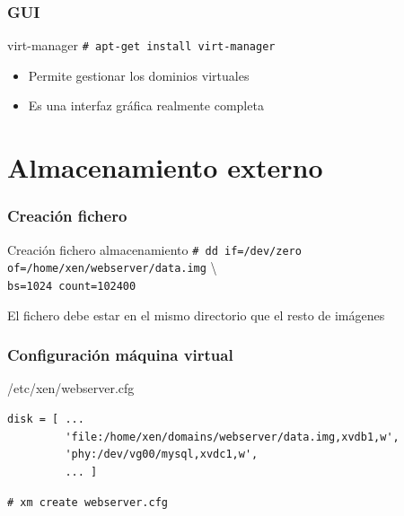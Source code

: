 \documentclass{beamer}
\begin{document}
\begin{frame}
  \frametitle{GUI}
  \begin{block}{virt-manager}
    \texttt{\# apt-get install virt-manager}
  \end{block}
  \bigskip
  \begin{itemize}
    \item Permite gestionar los dominios virtuales
    \item Es una interfaz gráfica realmente completa
  \end{itemize}
\end{frame}

\section{Almacenamiento externo}

\begin{frame}
  \frametitle{Creación fichero}
  \begin{block}{Creación fichero almacenamiento}
    \small{\texttt{\# dd if=/dev/zero of=/home/xen/webserver/data.img} \textbackslash  \\
    \texttt{bs=1024 count=102400}}
  \end{block}
  \bigskip
  \begin{center}
    El fichero debe estar en el mismo directorio que el resto de imágenes
  \end{center}
\end{frame}

\begin{frame}[fragile]
  \frametitle{Configuración máquina virtual}
  \begin{block}{/etc/xen/webserver.cfg}
    \small{\begin{verbatim}
disk = [ ...
         'file:/home/xen/domains/webserver/data.img,xvdb1,w',
         'phy:/dev/vg00/mysql,xvdc1,w',
         ... ]
    \end{verbatim}}
    \texttt{\# xm create webserver.cfg}
  \end{block}
\end{frame}
\end{document}
